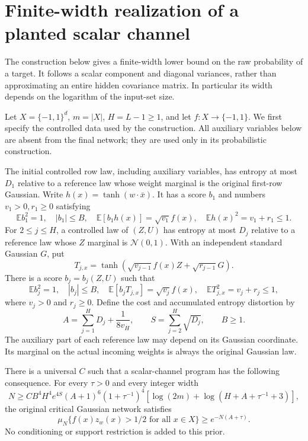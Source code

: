 \section{Finite-width realization of a planted scalar channel}
\label{sec:critical-finite-width-channel}

The construction below gives a finite-width lower bound on the raw
probability of a target.  It follows a scalar component and diagonal
variances, rather than approximating an entire hidden covariance matrix.
In particular its width depends on the logarithm of the input-set size.

Let $X=\{-1,1\}^d$, $m=|X|$, $H=L-1\ge1$, and let
$f:X\to\{-1,1\}$.  We first specify the controlled data used by the
construction.  All auxiliary variables below are absent from the final
network; they are used only in its probabilistic construction.

\begin{definition}
\label{def:critical-scalar-channel-program}
The initial controlled row law, including auxiliary variables, has entropy
at most $D_1$ relative to a reference law whose weight marginal is the
original first-row Gaussian.  Write $h(x)=\tanh(w\cdot\bar x)$.
It has a score $b_1$ and numbers $v_1>0,r_1\ge0$ satisfying
\[
 \mathbb E b_1^2=1,\quad |b_1|\le B,\quad
 \mathbb E[b_1h(x)]=\sqrt{v_1}f(x),\quad
 \mathbb E h(x)^2=v_1+r_1\le1.
\]
For $2\le j\le H$, a controlled law of $(Z,U)$ has entropy at
most $D_j$ relative to a reference law whose $Z$ marginal is
$\mathcal N(0,1)$.  With an independent standard Gaussian $G$, put
\[
 T_{j,x}=\tanh\!\left(\sqrt{v_{j-1}}f(x)Z+
                                      \sqrt{r_{j-1}}G\right).
\]
There is a score $b_j=b_j(Z,U)$ such that
\[
 \mathbb E b_j^2=1,\quad |b_j|\le B,\quad
 \mathbb E[b_jT_{j,x}]=\sqrt{v_j}f(x),\quad
 \mathbb E T_{j,x}^2=v_j+r_j\le1,
\]
where $v_j>0$ and $r_j\ge0$.  Define the cost and accumulated
entropy distortion by
\[
 A=\sum_{j=1}^H D_j+\frac1{8v_H},\qquad
 S=\sum_{j=2}^H\sqrt{D_j},\qquad B\ge1.
\]
The auxiliary part of each reference law may depend on its Gaussian
coordinate.  Its marginal on the actual incoming weights is always the
original Gaussian law.
\end{definition}

\begin{theorem}
\label{thm:critical-finite-channel-mass}
There is a universal $C$ such that a scalar-channel program has the
following consequence.  For every $\tau>0$ and every integer width
\begin{equation}\label{eq:critical-channel-width}
 N\ge C B^4H^4 e^{4S}(A+1)^6(1+\tau^{-1})^4
       \left[\log(2m)+\log(H+A+\tau^{-1}+3)\right],
\end{equation}
the original critical Gaussian network satisfies
\[
 \mu_N\{f(x)z_w(x)>1/2\text{ for all }x\in X\}
       \ge e^{-N(A+\tau)}.
\]
No conditioning or support restriction is added to this prior.
\end{theorem}

